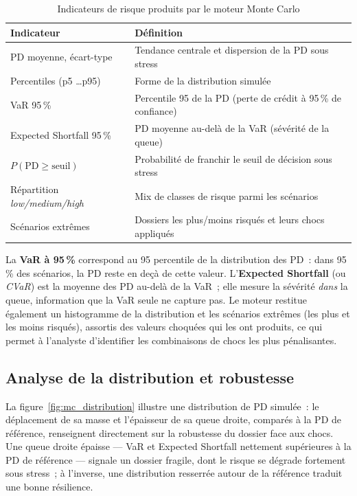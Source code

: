 \documentclass[a4paper,12pt,oneside]{report}
\begin{document}
\begin{table}[H]
\centering
\caption{Indicateurs de risque produits par le moteur Monte Carlo}
\label{tab:mc_indicateurs}
\renewcommand{\arraystretch}{1.3}
\begin{tabularx}{\textwidth}{@{}l Y@{}}
\toprule
\textbf{Indicateur} & \textbf{Définition} \\
\midrule
PD moyenne, écart-type & Tendance centrale et dispersion de la PD sous stress \\
Percentiles (p5 \dots p95) & Forme de la distribution simulée \\
VaR 95\,\% & Percentile 95 de la PD (perte de crédit à 95\,\% de confiance) \\
Expected Shortfall 95\,\% & PD moyenne au-delà de la VaR (sévérité de la queue) \\
$P(\text{PD} \geq \text{seuil})$ & Probabilité de franchir le seuil de décision sous stress \\
Répartition \textit{low/medium/high} & Mix de classes de risque parmi les scénarios \\
Scénarios extrêmes & Dossiers les plus/moins risqués et leurs chocs appliqués \\
\bottomrule
\end{tabularx}
\end{table}

\noindent
La \textbf{VaR à 95\,\%} correspond au 95 percentile de la distribution des PD~: dans
95\,\% des scénarios, la PD reste en deçà de cette valeur. L'\textbf{Expected Shortfall} (ou
\textit{CVaR}) est la moyenne des PD au-delà de la VaR~; elle mesure la sévérité \emph{dans} la
queue, information que la VaR seule ne capture pas. Le moteur restitue également un histogramme
de la distribution et les scénarios extrêmes (les plus et les moins risqués), assortis des
valeurs choquées qui les ont produits, ce qui permet à l'analyste d'identifier les combinaisons
de chocs les plus pénalisantes.

\subsection{Analyse de la distribution et robustesse}

La figure~\ref{fig:mc_distribution} illustre une distribution de PD simulée~: le déplacement de
sa masse et l'épaisseur de sa queue droite, comparés à la PD de référence, renseignent
directement sur la robustesse du dossier face aux chocs. Une queue droite épaisse — VaR et
Expected Shortfall nettement supérieures à la PD de référence — signale un dossier fragile,
dont le risque se dégrade fortement sous stress~; à l'inverse, une distribution resserrée
autour de la référence traduit une bonne résilience.
\end{document}
